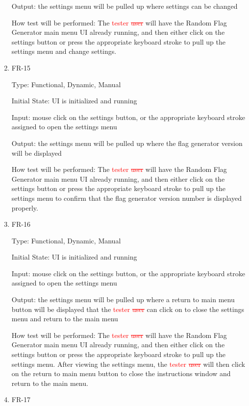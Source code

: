 \documentclass[12pt, titlepage]{article}
\begin{document}
\begin{enumerate}
Output: the settings menu will be pulled up where settings can be changed

How test will be performed: The \textcolor{red}{tester \sout{user}} will have
the Random Flag Generator main menu UI already running, and then either click
on the settings button or press the appropriate keyboard stroke to pull up the
settings menu and change settings.

\item{FR-15\\}

Type: Functional, Dynamic, Manual

Initial State: UI is initialized and running

Input: mouse click on the settings button, or the appropriate keyboard stroke
assigned to open the settings menu

Output: the settings menu will be pulled up where the flag generator version
will be displayed

How test will be performed: The \textcolor{red}{tester \sout{user}} will have
the Random Flag Generator main menu UI already running, and then either click
on the settings button or press the appropriate keyboard stroke to pull up the
settings menu to confirm that the flag generator version number is displayed
properly.

\item{FR-16\\}

Type: Functional, Dynamic, Manual

Initial State: UI is initialized and running

Input: mouse click on the settings button, or the appropriate keyboard stroke
assigned to open the settings menu

Output: the settings menu will be pulled up where a return to main menu button
will be displayed that the \textcolor{red}{tester \sout{user}} can click on to
close the settings menu and return to the main menu

How test will be performed: The \textcolor{red}{tester \sout{user}} will have
the Random Flag Generator main menu UI already running, and then either click
on the settings button or press the appropriate keyboard stroke to pull up the
settings menu. After viewing the settings menu, the \textcolor{red}{tester
\sout{user}} will then click on the return to main menu button to close the
instructions window and return to the main menu.

\item{FR-17\\}


\end{enumerate}
\end{document}
